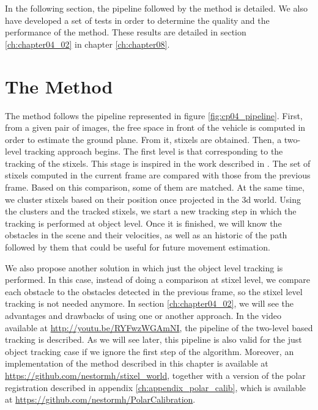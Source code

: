 In the following section, the pipeline followed by the method is detailed. We also have developed a set of tests in order to determine the quality and the performance of the method. These results are detailed in section \ref{ch:chapter04_02} in chapter \ref{ch:chapter08}.

\section{The Method}\label{ch:chapter04_01}

The method follows the pipeline represented in figure \ref{fig:cp04_pipeline}. First, from a given pair of images, the free space in front of the vehicle is computed in order to estimate the ground plane. From it, stixels are obtained. Then, a two-level tracking approach begins. The first level is that corresponding to the tracking of the stixels. This stage is inspired in the work described in \cite{gunyel2012stixels}. The set of stixels computed in the current frame are compared with those from the previous frame. Based on this comparison, some of them are matched. At the same time, we cluster stixels based on their position once projected in the 3d world. Using the clusters and the tracked stixels, we start a new tracking step in which the tracking is performed at object level. Once it is finished, we will know the obstacles in the scene and their velocities, as well as an historic of the path followed by them that could be useful for future movement estimation.

We also propose another solution in which just the object level tracking is performed. In this case, instead of doing a comparison at stixel level, we compare each obstacle to the obstacles detected in the previous frame, so the stixel level tracking is not needed anymore. In section \ref{ch:chapter04_02}, we will see the advantages and drawbacks of using one or another approach. In the video available at \url{http://youtu.be/RYFwzWGAmNI}, the pipeline of the two-level based tracking is described. As we will see later, this pipeline is also valid for the just object tracking case if we ignore the first step of the algorithm. Moreover, an implementation of the method described in this chapter is available at \url{https://github.com/nestormh/stixel_world}, together with a version of the polar registration described in appendix \ref{ch:appendix_polar_calib}, which is available at \url{https://github.com/nestormh/PolarCalibration}.

